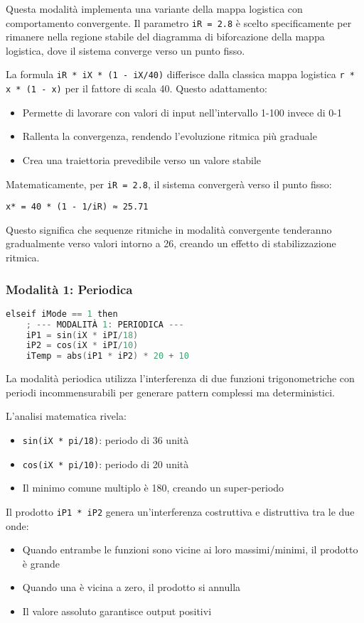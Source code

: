 Questa modalità implementa una variante della mappa logistica con comportamento convergente. Il parametro \texttt{iR = 2.8} è scelto specificamente per rimanere nella regione stabile del diagramma di biforcazione della mappa logistica, dove il sistema converge verso un punto fisso.

La formula \texttt{iR * iX * (1 {-} iX/40)} differisce dalla classica mappa logistica \texttt{r * x * (1 {-} x)} per il fattore di scala 40. Questo adattamento:
\begin{itemize}
 \item Permette di lavorare con valori di input nell'intervallo 1-100 invece di 0-1
 \item Rallenta la convergenza, rendendo l'evoluzione ritmica più graduale
 \item Crea una traiettoria prevedibile verso un valore stabile
\end{itemize}

Matematicamente, per \texttt{iR = 2.8}, il sistema convergerà verso il punto fisso:
\begin{lstlisting}
x* = 40 * (1 - 1/iR) ≈ 25.71
\end{lstlisting}

Questo significa che sequenze ritmiche in modalità convergente tenderanno gradualmente verso valori intorno a 26, creando un effetto di stabilizzazione ritmica.
\subsubsection{Modalità 1: Periodica}
\begin{lstlisting}[language=C]
elseif iMode == 1 then
    ; --- MODALITÀ 1: PERIODICA ---
    iP1 = sin(iX * iPI/18)
    iP2 = cos(iX * iPI/10)
    iTemp = abs(iP1 * iP2) * 20 + 10
\end{lstlisting}

La modalità periodica utilizza l'interferenza di due funzioni trigonometriche con periodi incommensurabili per generare pattern complessi ma deterministici.

L'analisi matematica rivela:
\begin{itemize}
 \item \texttt{sin(iX * pi/18)}: periodo di 36 unità
 \item \texttt{cos(iX * pi/10)}: periodo di 20 unità
 \item Il minimo comune multiplo è 180, creando un super-periodo
\end{itemize}

Il prodotto \texttt{iP1 * iP2} genera un'interferenza costruttiva e distruttiva tra le due onde:
\begin{itemize}
 \item Quando entrambe le funzioni sono vicine ai loro massimi/minimi, il prodotto è grande
 \item Quando una è vicina a zero, il prodotto si annulla
 \item Il valore assoluto garantisce output positivi
\end{itemize}

